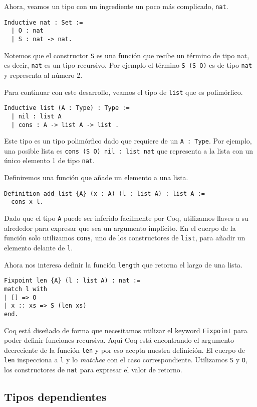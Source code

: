 Ahora, veamos un tipo con un ingrediente un poco más complicado, \lstinline{nat}.
\begin{lstlisting}
Inductive nat : Set :=
  | O : nat
  | S : nat -> nat.
\end{lstlisting}
Notemos que el constructor \lstinline{S} es una función que recibe un término de tipo {nat}, es decir, \lstinline{nat} es un tipo recursivo. Por ejemplo el término \lstinline{S (S O)} es de tipo \lstinline{nat} y representa al número 2.

Para continuar con este desarrollo, veamos el tipo de \lstinline{list} que es polimórfico.
\begin{lstlisting}
Inductive list (A : Type) : Type :=
  | nil : list A
  | cons : A -> list A -> list .
\end{lstlisting}
Este tipo es un tipo polimórfico dado que requiere de un \lstinline{A : Type}. Por ejemplo, una posible lista es \lstinline{cons (S O) nil : list nat} que representa a la lista con un único elemento 1 de tipo \lstinline{nat}.

Definiremos una función que añade un elemento a una lista.
\begin{lstlisting}
Definition add_list {A} (x : A) (l : list A) : list A :=
  cons x l.
\end{lstlisting}
Dado que el tipo \lstinline{A} puede ser inferido facilmente por Coq, utilizamos llaves a su alrededor para expresar que sea un argumento implícito. En el cuerpo de la función solo utilizamos \lstinline{cons}, uno de los constructores de \lstinline{list}, para añadir un elemento delante de \lstinline{l}.

Ahora nos interesa definir la función \lstinline{length} que retorna el largo de una lista.
\begin{lstlisting}
Fixpoint len {A} (l : list A) : nat :=
match l with
| [] => O
| x :: xs => S (len xs)
end.
\end{lstlisting}
Coq está diseñado de forma que necesitamos utilizar el keyword \lstinline{Fixpoint} para poder definir funciones recursiva. Aquí Coq está encontrando el argumento decreciente de la función \lstinline{len} y por eso acepta nuestra definición. El cuerpo de \lstinline{len} inspecciona a \lstinline{l} y lo \textit{matchea} con el caso correspondiente. Utilizamos \lstinline{S} y \lstinline{O}, los constructores de \lstinline{nat} para expresar el valor de retorno.

\subsection{Tipos dependientes}

